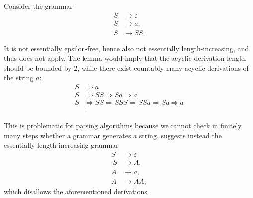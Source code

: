 \begin{example}\label{ex:unboudned_grammar_derivation_length}
  Consider the grammar
  \begin{equation}\label{eq:ex:unboudned_grammar_derivation_length/bad}
    \begin{aligned}
      S &\to \varepsilon \\
      S &\to a, \\
      S &\to SS.
    \end{aligned}
  \end{equation}

  It is not \hyperref[def:epsilon_free_grammar]{essentially epsilon-free}, hence also not \hyperref[def:length_increasing_grammar]{essentially length-increasing}, and thus  does not apply. The lemma would imply that the acyclic derivation length should be bounded by \( 2 \), while there exist countably many acyclic derivations of the string \( a \):
  \begin{equation*}
    \begin{aligned}
      S &\Rightarrow a \\
      S &\Rightarrow SS \Rightarrow Sa \Rightarrow a \\
      S &\Rightarrow SS \Rightarrow SSS \Rightarrow SSa \Rightarrow Sa \Rightarrow a \\
        &\vdots
    \end{aligned}
  \end{equation*}

  This is problematic for parsing algorithms because we cannot check in finitely many steps whether a grammar generates a string.  suggests instead the essentially length-increasing grammar
  \begin{equation*}
    \begin{aligned}
      S &\to \varepsilon \\\
      S &\to A, \\
      A &\to a, \\
      A &\to AA,
    \end{aligned}
  \end{equation*}
  which disallows the aforementioned derivations.
\end{example}


